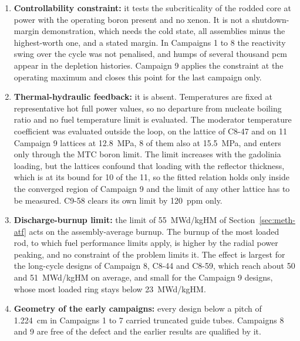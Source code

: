 \begin{enumerate}
  \item \textbf{Controllability constraint:} it tests the
        subcriticality of the rodded core at power with the operating
        boron present and no xenon. It is not a shutdown-margin
        demonstration, which needs the cold state, all assemblies minus
        the highest-worth one, and a stated margin. In Campaigns 1 to 8 the reactivity swing over the cycle was not penalised, and humps of
        several thousand pcm appear in the depletion histories.
        Campaign 9 applies the constraint at the operating maximum and
        closes this point for the last campaign only.

  \item \textbf{Thermal-hydraulic feedback:} it is absent. Temperatures
        are fixed at representative hot full power values, so no
        departure from nucleate boiling ratio and no fuel temperature
        limit is evaluated. The moderator temperature coefficient was
        evaluated outside the loop, on the lattice of C8-47 and on 11
        Campaign 9 lattices at \SI{12.8}{MPa}, 8 of them also at
        \SI{15.5}{MPa}, and enters only through the MTC boron limit. The
        limit increases with the gadolinia loading, but the lattices
        confound that loading with the reflector thickness, which is at
        its bound for 10 of the 11, so the fitted relation holds only
        inside the converged region of Campaign 9 and the limit of any
        other lattice has to be measured. C9-58 clears its own limit by
        \SI{120}{ppm} only.

  \item \textbf{Discharge-burnup limit:} the limit of \SI{55}{MWd/kgHM}
        of Section~\ref{sec:meth-atf} acts on the assembly-average
        burnup. The burnup of the most loaded rod, to which fuel
        performance limits apply, is higher by the radial power
        peaking, and no constraint of the problem limits it. The effect
        is largest for the long-cycle designs of Campaign 8, C8-44 and
        C8-59, which reach about 50 and \SI{51}{MWd/kgHM} on average,
        and small for the Campaign 9 designs, whose most loaded ring
        stays below \SI{23}{MWd/kgHM}.

  \item \textbf{Geometry of the early campaigns:} every design below a
        pitch of \SI{1.224}{cm} in Campaigns 1 to 7 carried truncated
        guide tubes. Campaigns 8 and 9 are free of the defect and the
        earlier results are qualified by it.


\end{enumerate}
